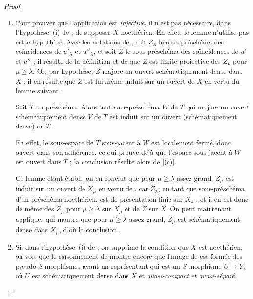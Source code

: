 \begin{proof}
\begin{remarks}[20.3.8.7]
\label{IV.20.3.8.7}
\begin{enumerate}[label=(\roman*)]
  \item Pour prouver que l'application  est \emph{injective}, il n'est pas nécessaire, dans l'hypothèse~(i) de , de supposer $X$ noethérien.
  En effet, le lemme  n'utilise pas cette hypothèse.
  Avec les notations de , soit $Z_\lambda$ le sous-préschéma des coïncidences de $u'_\lambda$ et $u''_\lambda$, et soit $Z$ le sous-préschéma des coïncidences de $u'$ et $u''$ ; il résulte de la définition  et de  que $Z$ est limite projective des $Z_\mu$ pour $\mu\geq\lambda$.
  Or, par hypothèse, $Z$ majore un ouvert schématiquement dense dans $X$ ; il en résulte que $Z$ est lui-même induit sur un ouvert de $X$ en vertu du lemme suivant :

\begin{lemma}[20.3.8.8]
\label{IV.20.3.8.8}
Soit $T$ un préschéma.
Alors tout sous-préschéma $W$ de $T$ qui majore un ouvert schématiquement dense $V$ de $T$ est induit sur un ouvert (schématiquement dense) de $T$.
\end{lemma}

  En effet, le sous-espace de $T$ sous-jacent à $W$ est localement fermé, donc ouvert
  dans son adhérence, ce qui prouve déjà que l'espace sous-jacent à $W$ est ouvert dans $T$ ; la conclusion résulte alors de [(c)].

  Ce lemme étant établi, on en conclut que pour $\mu\geq\lambda$ assez grand, $Z_\mu$ est induit sur un ouvert de $X_\mu$ en vertu de , car $Z_\lambda$, en tant que sous-préschéma d'un préschéma noethérien, est de présentation finie sur $X_\lambda$ , et il en est donc de même des $Z_\mu$ pour $\mu\geq\lambda$ sur $X_\mu$ et de $Z$ sur $X$.
  On peut maintenant appliquer  qui montre que pour $\mu\geq\lambda$ assez grand, $Z_\mu$ est schématiquement dense dans $X_\mu$, d'où la conclusion.

  \item Si, dans l'hypothèse~(i) de , on supprime la condition que $X$ est noethérien, on voit que le raisonnement de  montre encore que l'image de  est formée des pseudo-$S$-morphismes ayant un représentant qui est un $S$-morphisme $U\to Y$, où $U$ est schématiquement dense dans $X$ et \emph{quasi-compact et quasi-séparé}.
\end{enumerate}
\end{remarks}
\end{proof}

